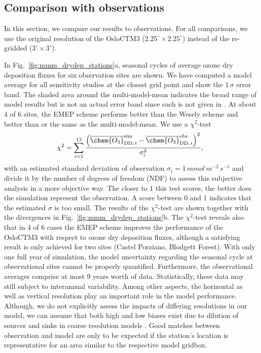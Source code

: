 \documentclass[gmd, manuscript]{copernicus}
\begin{document}
\subsection{Comparison with observations}
\label{subsec:obs}
In this section, we compare our results to observations. For all comparisons, we use the original resolution of the OsloCTM3 ($2.25^\circ\times 2.25^\circ$) instead of the re-gridded ($3^\circ\times 3^\circ$).

In Fig.~\ref{fig:mmm_drydep_stations}a, seasonal cycles of average ozone dry deposition fluxes for six observation sites are shown. We have computed a model average for all sensitivity studies at the closest grid point and show the $1\,\sigma$ error band. The shaded area around the multi-model-mean indicates the broad range of model results but is not an actual error band since such is not given in \citet{ACP:Hardacre2015}. At about $4$ of $6$ sites, the EMEP scheme performs better than the Wesely scheme and better than or the same as the multi-model-mean. We use a $\chi^2$-test
\begin{equation}
  \chi^2 = \sum_{i=1}^{12}\frac{\left(\overline{\chem{O_3}}_{\text{DD,\,}i}^\text{sim}-\overline{\chem{O_3}}_{\text{DD,\,}i}^\text{obs}\right)^2}{\sigma_i^2},
\end{equation}
with an estimated standard deviation of observation $\sigma_i=1\,\unit{mmol\,m^{-2}\,s^{-1}}$ and divide it by the number of degrees of freedom (NDF) to assess this subjective analysis in a more objective way. The closer to $1$ this test scores, the better does the simulation represent the observation. A score between $0$ and $1$ indicates that the estimated $\sigma$ is too small. The results of the $\chi^2$-test are shown together with the divergences in Fig.~\ref{fig:mmm_drydep_stations}b. The $\chi^2$-test reveals also that in $4$ of $6$ cases the EMEP scheme improves the performance of the OsloCTM3 with respect to ozone dry deposition fluxes, although a satisfying result is only achieved for two sites (Castel Porziano, Blodgett Forest).
With only one full year of simulation, the model uncertainty regarding the seasonal cycle at observational sites cannot be properly quantified. Furthermore, the observational averages comprise at most $9$ years worth of data. Statistically, these data may still subject to interannual variability. Among other aspects, the horizontal as well as vertical resolution play an important role in the model performance. Although, we do not explicitly assess the impacts of differing resolutions in our model, we can assume that both high and low biases exist due to dilution of sources and sinks in coarse resolution models \citep{AE:Schaap2015}. Good matches between observation and model are only to be expected if the station's location is representative for an area similar to the respective model gridbox.
\end{document}
